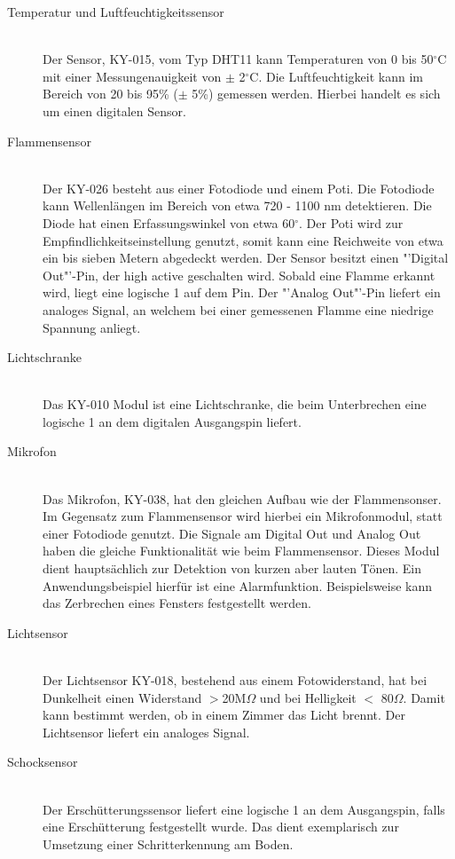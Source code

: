 \begin{description}
\item[Temperatur und Luftfeuchtigkeitssensor] \hfill \\
	Der Sensor, KY-015, vom Typ DHT11 kann Temperaturen von 0 bis 50$^\circ$C mit einer Messungenauigkeit von $\pm$ 2$^\circ$C. Die Luftfeuchtigkeit kann im Bereich von 20 bis 95\% ($\pm$ 5\%) gemessen werden. Hierbei handelt es sich um einen digitalen Sensor.  
\item[Flammensensor]\hfill \\
	Der KY-026 besteht aus einer Fotodiode und einem \ac{Poti}. Die Fotodiode kann Wellenlängen im Bereich von etwa 720 - 1100 nm detektieren. Die Diode hat einen Erfassungswinkel von etwa 60$^\circ$. Der \ac{Poti} wird zur Empfindlichkeitseinstellung genutzt, somit kann eine Reichweite von etwa  ein bis sieben Metern abgedeckt werden. Der Sensor besitzt einen "'Digital Out"'-Pin, der high active geschalten wird. Sobald eine Flamme erkannt wird, liegt eine logische 1 auf dem Pin. Der "'Analog Out"'-Pin liefert ein analoges Signal, an welchem bei einer gemessenen Flamme eine niedrige Spannung anliegt.
\item[Lichtschranke]\hfill \\
	Das KY-010 Modul ist eine Lichtschranke, die beim Unterbrechen eine logische 1 an dem digitalen Ausgangspin liefert.
\item[Mikrofon]\hfill \\
	Das Mikrofon, KY-038, hat den gleichen Aufbau wie der Flammensonser. Im Gegensatz zum Flammensensor wird hierbei ein Mikrofonmodul, statt einer Fotodiode genutzt. Die Signale am Digital Out und Analog Out haben die gleiche Funktionalität wie beim Flammensensor. Dieses Modul dient hauptsächlich zur Detektion von kurzen aber lauten Tönen. Ein Anwendungsbeispiel hierfür ist eine Alarmfunktion. Beispielsweise kann das Zerbrechen eines Fensters festgestellt werden.
\item[Lichtsensor]\hfill \\
	Der Lichtsensor KY-018, bestehend aus einem Fotowiderstand, hat bei Dunkelheit einen Widerstand $>$20M$\Omega$ und bei Helligkeit $<$ 80$\Omega$. Damit kann bestimmt werden, ob in einem Zimmer das Licht brennt. Der Lichtsensor liefert ein analoges Signal.
\item[Schocksensor]\hfill \\
	Der Erschütterungssensor liefert eine logische 1 an dem Ausgangspin, falls eine Erschütterung festgestellt wurde. Das dient exemplarisch zur Umsetzung einer Schritterkennung am Boden.
\end{description}